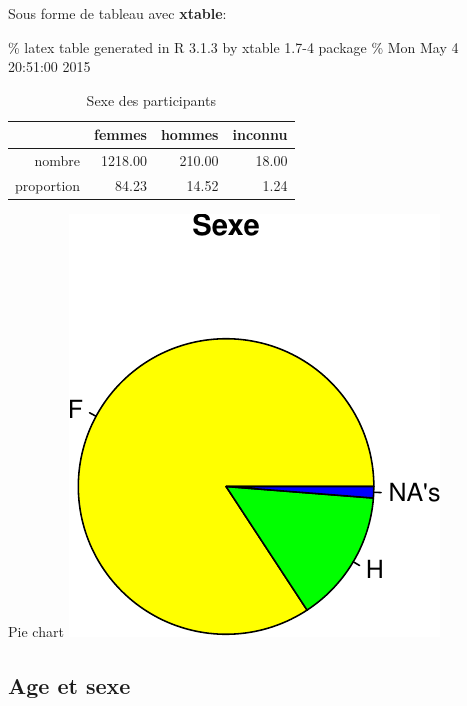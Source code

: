 \documentclass[]{article}
\begin{document}
Sous forme de tableau avec \textbf{xtable}:

\% latex table generated in R 3.1.3 by xtable 1.7-4 package \% Mon May 4
20:51:00 2015

\begin{table}[ht]
\centering
\begin{tabular}{rrrr}
  \hline
 & femmes & hommes & inconnu \\ 
  \hline
nombre & 1218.00 & 210.00 & 18.00 \\ 
  proportion & 84.23 & 14.52 & 1.24 \\ 
   \hline
\end{tabular}
\caption{Sexe des participants} 
\label{sexe}
\end{table}

Pie chart
\includegraphics{qs_etudiants_files/figure-latex/pie_sexe-1.pdf}

\subsection{Age et sexe}\label{age-et-sexe}
\end{document}
